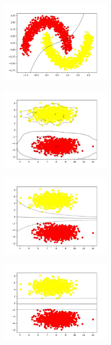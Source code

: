 \documentclass[12pt,titlepage,a4page , tikz , multi,table , svgnames,xcdraw]{article}
\begin{document}
\begin{center}

 \includegraphics[width=0.4\textwidth]{images/24.jpg}

\end{center}


\begin{center}

 \includegraphics[width=0.4\textwidth]{images/30.jpg}

\end{center}


\begin{center}

 \includegraphics[width=0.4\textwidth]{images/31.jpg}

\end{center}


\begin{center}

 \includegraphics[width=0.4\textwidth]{images/32.jpg}

\end{center}
\end{document}
